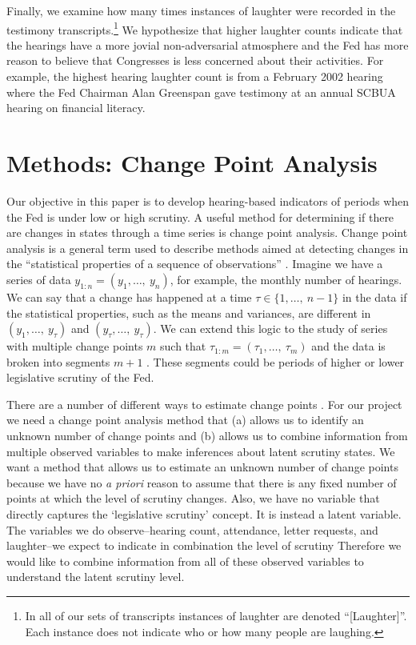 \documentclass[a4paper]{article}\usepackage[]{graphicx}\usepackage[]{color}
\begin{document}
Finally, we examine how many times instances of laughter were recorded in the testimony transcripts.\footnote{In all of our sets of transcripts instances of laughter are denoted ``[Laughter]''. Each instance does not indicate who or how many people are laughing.} We hypothesize that higher laughter counts indicate that the hearings have a more jovial non-adversarial atmosphere and the Fed has more reason to believe that Congresses is less concerned about their activities. For example, the highest hearing laughter count is from a February 2002 hearing where the Fed Chairman Alan Greenspan gave testimony at an annual SCBUA hearing on financial literacy.

\section{Methods: Change Point Analysis}

Our objective in this paper is to develop hearing-based indicators of periods when the Fed is under low or high scrutiny. A useful method for determining if there are changes in states through a time series is change point analysis. Change point analysis is a general term used to describe methods aimed at detecting changes in the ``statistical properties of a sequence of observations'' \cite[2]{Killick2013}. Imagine we have a series of data $y_{1:n} = (y_{1},\ldots,\: y_{n})$, for example, the monthly number of hearings.  We can say that a change has happened at a time $\tau \in \{1,\ldots,\:n-1\}$ in the data if the statistical properties, such as the means and variances, are different in $(y_{1},\ldots,\: y_{\tau})$ and $(y_{\tau},\ldots,\: y_{\tau})$. We can extend this logic to the study of series with multiple change points $m$ such that $\tau_{1:m} = (\tau_{1},\ldots,\:\tau_{m})$ and the data is broken into segments $m + 1$ \citep{Killick2012,Killick2013}. These segments could be periods of higher or lower legislative scrutiny of the Fed.

There are a number of different ways to estimate change points \cite[see][]{Killick2013,Matteson2014}. For our project we need a change point analysis method that (a) allows us to identify an unknown number of change points and (b) allows us to combine information from multiple observed variables to make inferences about latent scrutiny states. We want a method that allows us to estimate an unknown number of change points because we have no \emph{a priori} reason to assume that there is any fixed number of points at which the level of scrutiny changes. Also, we have no variable that directly captures the `legislative scrutiny' concept. It is instead a latent variable. The variables we do observe--hearing count, attendance, letter requests, and laughter--we expect to indicate in combination the level of scrutiny  Therefore we would like to combine information from all of these observed variables to understand the latent scrutiny level.
\end{document}
